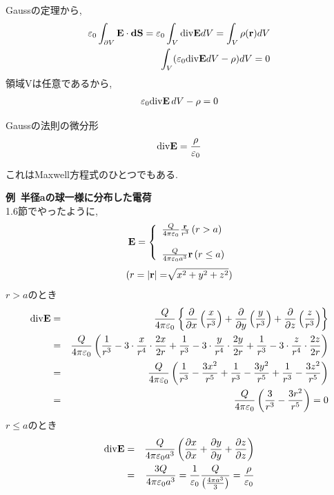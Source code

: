\documentclass[../main]{subfiles}
\begin{document}
Gaussの定理から,
\begin{eqnarray}
\varepsilon_0 \int_{\partial V}^{}{\bf E}\cdot {\bf dS} = \varepsilon_0 \int_{V}^{}{\rm div}{\bf E}dV = \int_{V}^{}\rho({\bf r})dV \\
\int_{V}^{} ( \varepsilon_0{\rm div}{\bf E}dV - \rho ) dV =0
\end{eqnarray}
領域Vは任意であるから,
\begin{eqnarray}
\varepsilon_0{\rm div}{\bf E}\,dV - \rho =0
\end{eqnarray}

\begin{itembox}[c]{Gaussの法則の微分形}
\begin{eqnarray}
{\rm div}{\bf E}=\frac{\rho}{\varepsilon_0}
\end{eqnarray}
\end{itembox}
これはMaxwell方程式のひとつでもある.


{\bf 例\, 半径aの球一様に分布した電荷}\\
1.6節でやったように,\\
\begin{equation}
{\bf E}=
\left \{
\begin{array}{l}
\frac{Q}{4 \pi \varepsilon_0}\frac{{\bf r}}{r^3} \, (r > a)\\
\\
\frac{Q}{4 \pi \varepsilon_0 a^3}{\bf r} \, (r \leq a)
\end{array}
\right.
\end{equation}
\begin{equation}
(r=|{\bf r}|=\sqrt[]{\mathstrut x^2+y^2+z^2})
\end{equation}
$r > a$のとき\\
\begin{eqnarray}
{\rm div}{\bf E}&=&\frac{Q}{4 \pi \varepsilon_0} \left\{\frac{\partial}{\partial x}\left(\frac{x}{r^3}\right)+\frac{\partial}{\partial y}\left(\frac{y}{r^3}\right)+\frac{\partial}{\partial z}\left(\frac{z}{r^3}\right) \right\} \\
&=&\frac{Q}{4 \pi \varepsilon_0} \left( \frac{1}{r^3}-3 \cdot \frac{x}{r^4} \cdot \frac{2x}{2r}+\frac{1}{r^3}-3 \cdot \frac{y}{r^4} \cdot \frac{2y}{2r}+\frac{1}{r^3}-3 \cdot \frac{z}{r^4} \cdot \frac{2z}{2r} \right) \\
&=&\frac{Q}{4 \pi \varepsilon_0} \left( \frac{1}{r^3}-\frac{3x^2}{r^5}+\frac{1}{r^3}-\frac{3y^2}{r^5}+\frac{1}{r^3}-\frac{3z^2}{r^5} \right) \\
&=&\frac{Q}{4 \pi \varepsilon_0} \left( \frac{3}{r^3}-\frac{3r^2}{r^5} \right) = 0
\end{eqnarray}
$r \leq a$のとき\\
\begin{eqnarray}
{\rm div}{\bf E}&=&\frac{Q}{4 \pi \varepsilon_0 a^3} \left( \frac{\partial x}{\partial x}+\frac{\partial y}{\partial y}+\frac{\partial z}{\partial z} \right)\\
&=&\frac{3Q}{4 \pi \varepsilon_0 a^3}=\frac{1}{\varepsilon_0}\frac{Q}{\left( \frac{4 \pi a^3}{3} \right)}=\frac{\rho}{\varepsilon_0}
\end{eqnarray}
\end{document}

